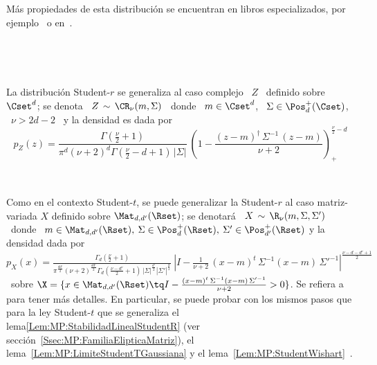 M\'as propiedades de esta distribuci\'on se encuentran en libros especializados,
por ejemplo~\cite{FanKot90, KotBal00} o en~\cite[Sec.~3.2.1]{Zoz12}.

\

\

La distribuci\'on  Student-$r$ se generaliza al  caso complejo \  $Z$ \ definido
sobre $\Cset^d$; se denota  \ $Z \, \sim \, \CR_\nu(m,\Sigma)$ \  donde \ $m \in
\Cset^d$, \ $\Sigma \in \Pos_d^+(\Cset)$, \ $\nu > 2 d - 2$ \ y la densidad es dada
por \
%
\[
p_Z(z) = \frac{\Gamma\left( \frac{\nu}{2} + 1 \right)}{\pi^d (\nu+2)^d \Gamma\left(
    \frac{\nu}{2} - d + 1   \right)  \,   \left|   \Sigma  \right|}   \:   \left(  1   -
  \frac{(z-m)^\dag \, \Sigma^{-1} \, (z-m)}{\nu+2} \right)_+^{\frac{\nu}{2}-d}
\]

\

Como en  el contexto  Student-$t$, se puede  generalizar la Student-$r$  al caso
matriz-variada $X$  definido sobre $\Mat_{d,d'}(\Rset)$;  se denotar\'a \  $X \,
\sim \, \R_\nu(m,\Sigma,\Sigma')$ \ donde \ $m \in \Mat_{d,d'}(\Rset), \: \Sigma
\in \Pos_d^+(\Rset), \:  \Sigma' \in \Pos_{d'}^+(\Rset)$ y la  densidad dada por
$\displaystyle      p_X(x)      =      \frac{\Gamma_d\left(      \frac{\nu}{2}+1
  \right)}{\pi^{\frac{d   d'}{2}}    (\nu+2)^{\frac{d   d'}{2}}   \Gamma_d\left(
    \frac{\nu-d'}{2} +  1\right) \, \left|  \Sigma \right|^{\frac{d'}{2}} \left|
    \Sigma' \right|^{\frac{d}{2}}}  \: \left| I - \frac{1}{\nu+2}  \, (x-m)^t \,
  \Sigma^{-1} (x-m) \,  \Sigma'^{-1} \right|^{\frac{\nu-d-d'+1}{2}}$ \ sobre $\X
= \{  x \in  \Mat_{d,d'}(\Rset) \tq  I - \frac{(x-m)^t  \, \Sigma^{-1}  (x-m) \,
  \Sigma'^{-1}}{\nu+2} > 0 \}$.  Se refiera a~\cite[Cap.~4]{GupNag99} para tener
m\'as detalles. En particular, se puede  probar con los mismos pasos que para la
ley Student-$t$  que se generaliza  el lema\ref{Lem:MP:StabilidadLinealStudentR}
(ver              secci\'on~\ref{Ssec:MP:FamiliaElipticaMatriz}),             el
lema~\ref{Lem:MP:LimiteStudentTGaussiana}                  y                  el
lema~\ref{Lem:MP:StudentWishart}~\cite[Teo.~4.2.1]{GupNag99}.
